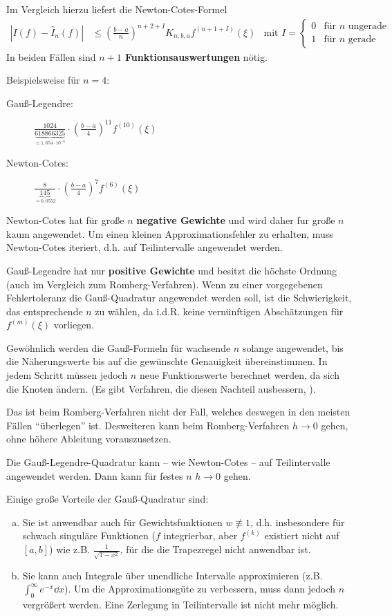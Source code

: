 Im Vergleich hierzu liefert die Newton-Cotes-Formel
\begin{align*}
  \left| I(f)-\hat{I}_n(f) \right| 
  &\leq \left(\frac{b-a}{n} \right)^{n+2+I} K_{n,b,a}f^{(n+1+I)}(\xi)
  & \text{mit } I=\begin{cases}
    0&\text{für $n$ ungerade}\\
    1&\text{für $n$ gerade}
  \end{cases}
\end{align*}
In beiden Fällen sind \textbf{$n+1$ Funktionsauswertungen} nötig.

Beispielsweise für $n=4$:
\begin{description}
\item[Gauß-Legendre:] 
  $\frac{1024}{\underbrace{618866325}_{\approx 1,654\cdot 10^{-6}}}
  \cdot \left(\frac{b-a}{4} \right)^{11}f^{(10)}(\xi)$
\item[Newton-Cotes:]
  $\frac{8}{\underbrace{145}_{=0,0552}}
  \cdot \left(\frac{b-a}{4} \right)^{7}f^{(6)}(\xi)$
\end{description}
Newton-Cotes hat für große $n$ \textbf{negative Gewichte} und wird
daher fur große $n$ kaum angewendet. Um einen kleinen
Approximationsfehler zu erhalten, muss Newton-Cotes iteriert,
d.h. auf Teilintervalle angewendet werden.

Gauß-Legendre hat nur \textbf{positive Gewichte} und besitzt die
höchste Ordnung (auch im Vergleich zum Romberg-Verfahren).
Wenn zu einer vorgegebenen Fehlertoleranz die
Gauß-Quadratur angewendet werden soll, ist die Schwierigkeit,
das entsprechende $n$ zu wählen, da i.d.R. keine vernünftigen
Abschätzungen für $f^{(m)}(\xi)$ vorliegen.

Gewöhnlich werden die Gauß-Formeln für wachsende $n$ solange
angewendet, bis die Näherungswerte bis auf die gewünschte
Genauigkeit übereinstimmen.
In jedem Schritt müssen jedoch $n$ neue Funktionswerte
berechnet werden, da sich die Knoten ändern. (Es gibt
Verfahren, die diesen Nachteil ausbessern, \cite[siehe][]{stoer}).

Das ist beim Romberg-Verfahren nicht der Fall, welches
deswegen in den meisten Fällen \enquote{überlegen} ist. 
Desweiteren kann beim Romberg-Verfahren $h\to 0$ gehen,
ohne höhere Ableitung vorauszusetzen.

Die Gauß-Legendre-Quadratur kann – wie Newton-Cotes – auf
Teilintervalle angewendet werden.
Dann kann für festes $n$ $h\to 0$ gehen.

Einige große Vorteile der Gauß-Quadratur sind:
\begin{enumerate}[a)]
\item Sie ist anwendbar auch für Gewichtsfunktionen $w\not\equiv 1$,
  d.h. insbesondere für schwach singuläre Funktionen
($f$ integrierbar, aber $f^{(k)}$ existiert nicht auf $[a,b]$)
wie z.B. $\frac{1}{\sqrt{1-x^2}}$, 
für die die Trapezregel nicht anwendbar ist. 
\item Sie kann auch Integrale über unendliche Intervalle
  approximieren (z.B. $\int_0^\infty e^{-x}\dd x$). 
  Um die Approximationsgüte zu verbessern, 
  muss dann jedoch $n$ vergrößert werden. 
  Eine Zerlegung in Teilintervalle ist nicht mehr möglich.
\end{enumerate}

